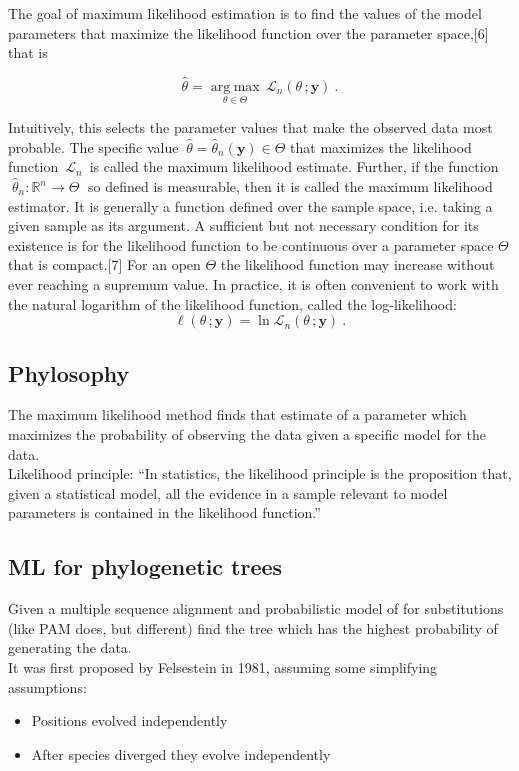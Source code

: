 The goal of maximum likelihood estimation is to find the values of the model parameters that maximize the likelihood function over the parameter space,[6] that is

\begin{equation}
{\hat {\theta }}={\underset {\theta \in \Theta }{\operatorname {arg\;max} }\,{\mathcal {L}}_{n}(\theta \,;\mathbf {y} )~.}
\end{equation}

Intuitively, this selects the parameter values that make the observed data most probable. The specific value
$  ~{\hat {\theta }}={\hat {\theta }}_{n}(\mathbf {y} )\in \Theta $ that maximizes the likelihood function
$ \,{\mathcal {L}}_{n}\,$ is called the maximum likelihood estimate. Further, if the function
$ \;{\hat {\theta }}_{n}:\mathbb {R} ^{n}\to \Theta \;$
so defined is measurable, then it is called the maximum likelihood estimator. It is generally a function defined over the sample space, i.e. taking a given sample as its argument. A sufficient but not necessary condition for its existence is for the likelihood function to be continuous over a parameter space $\Theta$ that is compact.[7] For an open $\Theta$  the likelihood function may increase without ever reaching a supremum value.
In practice, it is often convenient to work with the natural logarithm of the likelihood function, called the log-likelihood:
\begin{equation}
\ell (\theta \,;\mathbf {y} )=\ln {\mathcal {L}}_{n}(\theta \,;\mathbf {y} )~.
\end{equation}

\subsection{Phylosophy}
The maximum likelihood method finds that estimate of a parameter which maximizes the probability of observing the data given a specific model for the data.\\
Likelihood principle: “In statistics, the likelihood principle is the proposition that, given a statistical model, all the evidence in a sample relevant to model parameters is contained in the likelihood function.”

\subsection{ML for phylogenetic trees}
Given a multiple sequence alignment and probabilistic model of for substitutions (like PAM does, but different) find the tree which has the highest probability of generating the data.
\\
It was first proposed by Felsestein in 1981, assuming some simplifying assumptions:
\begin{itemize}
\item Positions evolved independently
\item After species diverged they evolve independently
\end{itemize}

